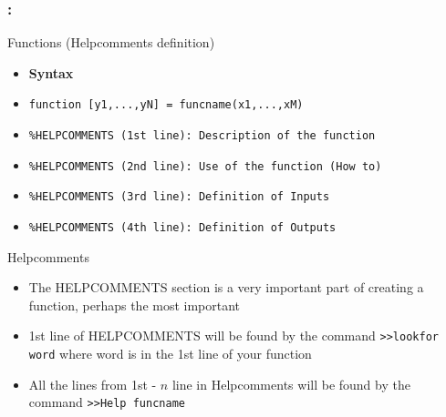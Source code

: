 \documentclass[11pt]{beamer}
\begin{document}
\begin{frame}[fragile]
	
	\frametitle{\secname : \subsecname}
	\vspace{-11pt}
	\begin{exampleblock}{Functions (Helpcomments definition)}
		\begin{itemize}
			\item[] \textbf{Syntax}			
			\item[] \verb|function [y1,...,yN] = funcname(x1,...,xM)|
			\item[] \verb|%HELPCOMMENTS (1st line): Description of the function|
			\item[] \verb|%HELPCOMMENTS (2nd line): Use of the function (How to)|						
			\item[] \verb|%HELPCOMMENTS (3rd line): Definition of Inputs|
			\item[] \verb|%HELPCOMMENTS (4th line): Definition of Outputs|			
			\end{itemize}
	\end{exampleblock}
	\vspace{0mm}
\begin{alertblock}{Helpcomments}
		\begin{itemize}
			\item The HELPCOMMENTS section is a very important part of creating a function, perhaps the most important
			\item 1st line of HELPCOMMENTS will be found by the command \verb|>>lookfor word| where word is in the 1st line of your function
			\item All the lines from 1st - $n$ line in Helpcomments will be found by the command \verb|>>Help funcname|			
		\end{itemize}
\end{alertblock}
	
\end{frame}
\end{document}
